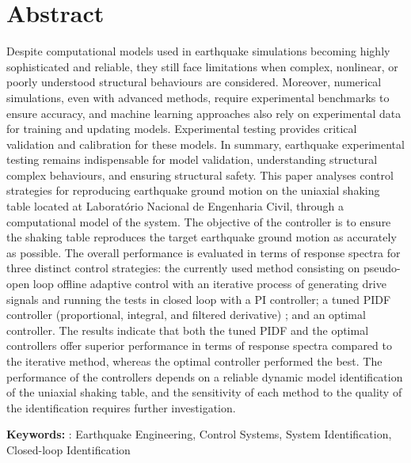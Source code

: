 \documentclass[10pt]{extarticle}
\begin{document}
\section{Abstract}

Despite computational models used in earthquake simulations becoming highly sophisticated and reliable, they still face limitations when complex, nonlinear, or poorly understood structural behaviours are considered.  Moreover, numerical simulations, even with advanced methods, require experimental benchmarks to ensure accuracy, and machine learning approaches also rely on experimental data for training and updating models. Experimental testing provides critical validation and calibration for these models. In summary, earthquake experimental testing remains indispensable for model validation, understanding structural complex behaviours, and ensuring structural safety.
This paper analyses control strategies for reproducing earthquake ground motion on the uniaxial shaking table located at Laboratório Nacional de Engenharia Civil, through a computational model of the system. The objective of the controller is to ensure the shaking table reproduces the target earthquake ground motion as accurately as possible. The overall performance is evaluated in terms of response spectra for three distinct control strategies: the currently used method consisting on pseudo-open loop offline adaptive control with an iterative process of generating drive signals and running the tests in closed loop with a PI controller; a tuned PIDF controller (proportional, integral, and filtered derivative) ; and an optimal controller. 
The results indicate that both the tuned PIDF and the optimal controllers offer superior performance in terms of response spectra compared to the iterative method, whereas the optimal controller performed the best. The performance of the controllers depends on a reliable dynamic model identification of the uniaxial shaking table, and the sensitivity of each method to the quality of the identification requires further investigation.

\vspace{10mm}

\textbf{Keywords:} : Earthquake Engineering, Control Systems, System Identification, Closed-loop Identification

\clearpage
\tableofcontents %

\listoftables %
    
\end{document}
